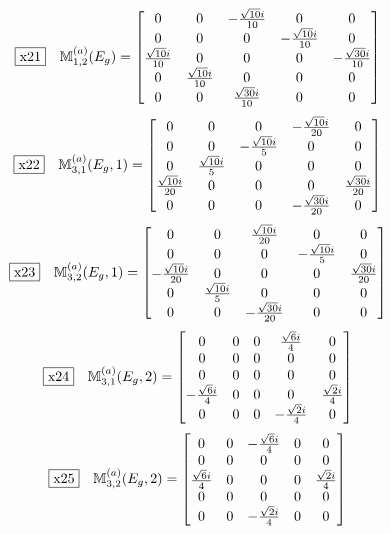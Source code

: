 \documentclass[fleqn,10pt,landscape]{jsarticle}
\begin{document}
\begin{dmath*}
\fbox{x21}\quad \mathbb{M}_{1,2}^{(a)}(E_{g})=\begin{bmatrix} 0 & 0 & - \frac{\sqrt{10} i}{10} & 0 & 0 \\ 0 & 0 & 0 & - \frac{\sqrt{10} i}{10} & 0 \\ \frac{\sqrt{10} i}{10} & 0 & 0 & 0 & - \frac{\sqrt{30} i}{10} \\ 0 & \frac{\sqrt{10} i}{10} & 0 & 0 & 0 \\ 0 & 0 & \frac{\sqrt{30} i}{10} & 0 & 0 \end{bmatrix}
\end{dmath*}
\begin{dmath*}
\fbox{x22}\quad \mathbb{M}_{3,1}^{(a)}(E_{g},1)=\begin{bmatrix} 0 & 0 & 0 & - \frac{\sqrt{10} i}{20} & 0 \\ 0 & 0 & - \frac{\sqrt{10} i}{5} & 0 & 0 \\ 0 & \frac{\sqrt{10} i}{5} & 0 & 0 & 0 \\ \frac{\sqrt{10} i}{20} & 0 & 0 & 0 & \frac{\sqrt{30} i}{20} \\ 0 & 0 & 0 & - \frac{\sqrt{30} i}{20} & 0 \end{bmatrix}
\end{dmath*}
\begin{dmath*}
\fbox{x23}\quad \mathbb{M}_{3,2}^{(a)}(E_{g},1)=\begin{bmatrix} 0 & 0 & \frac{\sqrt{10} i}{20} & 0 & 0 \\ 0 & 0 & 0 & - \frac{\sqrt{10} i}{5} & 0 \\ - \frac{\sqrt{10} i}{20} & 0 & 0 & 0 & \frac{\sqrt{30} i}{20} \\ 0 & \frac{\sqrt{10} i}{5} & 0 & 0 & 0 \\ 0 & 0 & - \frac{\sqrt{30} i}{20} & 0 & 0 \end{bmatrix}
\end{dmath*}
\begin{dmath*}
\fbox{x24}\quad \mathbb{M}_{3,1}^{(a)}(E_{g},2)=\begin{bmatrix} 0 & 0 & 0 & \frac{\sqrt{6} i}{4} & 0 \\ 0 & 0 & 0 & 0 & 0 \\ 0 & 0 & 0 & 0 & 0 \\ - \frac{\sqrt{6} i}{4} & 0 & 0 & 0 & \frac{\sqrt{2} i}{4} \\ 0 & 0 & 0 & - \frac{\sqrt{2} i}{4} & 0 \end{bmatrix}
\end{dmath*}
\begin{dmath*}
\fbox{x25}\quad \mathbb{M}_{3,2}^{(a)}(E_{g},2)=\begin{bmatrix} 0 & 0 & - \frac{\sqrt{6} i}{4} & 0 & 0 \\ 0 & 0 & 0 & 0 & 0 \\ \frac{\sqrt{6} i}{4} & 0 & 0 & 0 & \frac{\sqrt{2} i}{4} \\ 0 & 0 & 0 & 0 & 0 \\ 0 & 0 & - \frac{\sqrt{2} i}{4} & 0 & 0 \end{bmatrix}
\end{dmath*}
\vspace{5mm}
\end{document}
